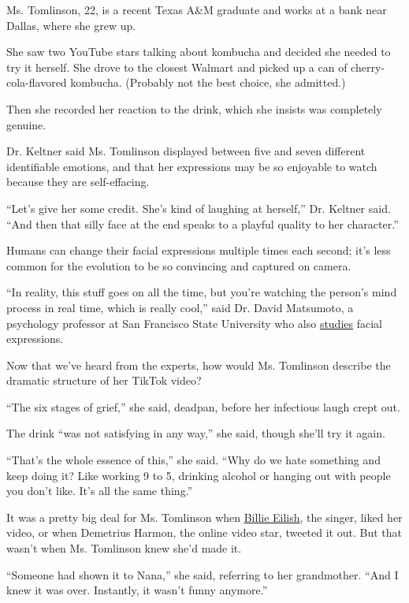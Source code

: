 Ms. Tomlinson, 22, is a recent Texas A\&M graduate and works at a bank
near Dallas, where she grew up.

She saw two YouTube stars talking about kombucha and decided she needed
to try it herself. She drove to the closest Walmart and picked up a can
of cherry-cola-flavored kombucha. (Probably not the best choice, she
admitted.)

Then she recorded her reaction to the drink, which she insists was
completely genuine.

Dr. Keltner said Ms. Tomlinson displayed between five and seven
different identifiable emotions, and that her expressions may be so
enjoyable to watch because they are self-effacing.

``Let's give her some credit. She's kind of laughing at herself,'' Dr.
Keltner said. ``And then that silly face at the end speaks to a playful
quality to her character.''

Humans can change their facial expressions multiple times each second;
it's less common for the evolution to be so convincing and captured on
camera.

``In reality, this stuff goes on all the time, but you're watching the
person's mind process in real time, which is really cool,'' said Dr.
David Matsumoto, a psychology professor at San Francisco State
University who also \href{http://www.davidmatsumoto.com/}{studies}
facial expressions.

Now that we've heard from the experts, how would Ms. Tomlinson describe
the dramatic structure of her TikTok video?

``The six stages of grief,'' she said, deadpan, before her infectious
laugh crept out.

The drink ``was not satisfying in any way,'' she said, though she'll try
it again.

``That's the whole essence of this,'' she said. ``Why do we hate
something and keep doing it? Like working 9 to 5, drinking alcohol or
hanging out with people you don't like. It's all the same thing.''

It was a pretty big deal for Ms. Tomlinson when
\href{https://www.nytimes3xbfgragh.onion/2019/03/28/arts/music/billie-eilish-debut-album.html}{Billie
Eilish}, the singer, liked her video, or when Demetrius Harmon, the
online video star, tweeted it out. But that wasn't when Ms. Tomlinson
knew she'd made it.

``Someone had shown it to Nana,'' she said, referring to her
grandmother. ``And I knew it was over. Instantly, it wasn't funny
anymore.''

